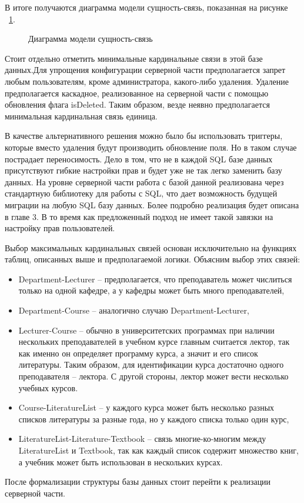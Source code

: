 В итоге получаются диаграмма модели сущность-связь, показанная на рисунке ~\ref{ris:ermodel}.

\begin{figure}[h!]
	\caption{Диаграмма модели сущность-связь}
	\label{ris:ermodel}
\end{figure}

Стоит отдельно отметить минимальные кардинальные связи в этой базе данных.Для упрощения конфигурации серверной части предполагается 
запрет любым пользователям,
кроме администратора, какого-либо удаления. Удаление предполагается каскадное, реализованное на серверной части
с помощью обновления флага isDeleted. Таким образом, везде неявно предполагается минимальная кардинальная связь единица.

В качестве альтернативного решения можно было бы использовать триггеры, которые вместо удаления будут
производить обновление поля. Но в таком случае пострадает переносимость. Дело в том, что не в каждой
SQL базе данных присутствуют гибкие настройки прав и будет уже не так легко заменить базу данных.
На уровне серверной части работа с базой данной реализована через стандартную библиотеку для работы с
SQL, что дает возможность будущей миграции на любую SQL базу данных. Более подробно реализация будет описана в главе 3.
В то время как предложенный подход не имеет такой завязки на настройку прав пользователей.

Выбор максимальных кардинальных связей основан исключительно на функциях таблиц, описанных выше и предполагаемой
логики. Объясним выбор этих связей:

\begin{itemize}
	\item Department-Lecturer -- предполагается, что преподаватель может числиться только на одной кафедре, а у кафедры 
	      может быть много преподавателей,
	\item Department-Course -- аналогично случаю Department-Lecturer,
	\item Lecturer-Course -- обычно в университетских программах при наличии нескольких преподавателей в учебном
	      курсе главным считается лектор, так как именно он определяет программу курса, а значит и его список литературы. 
	      Таким образом, для идентификации курса достаточно одного преподавателя -- лектора. С другой стороны, лектор может
	      вести несколько учебных курсов.
	\item Course-LiteratureList -- у каждого курса может быть несколько разных списков литературы за разные года, но
	      у каждого списка только один курс,
	\item LiteratureList-Literature-Textbook -- связь многие-ко-многим между LiteratureList и Textbook, так как
	      каждый список содержит множество книг, а учебник может быть использован в нескольких курсах.
\end{itemize}

После формализации структуры базы данных стоит перейти к реализации серверной части.